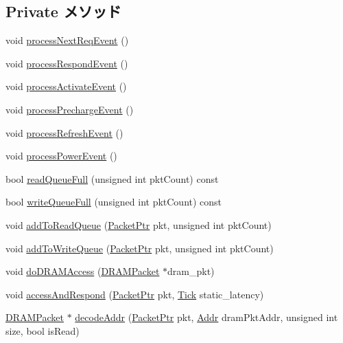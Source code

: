 \subsection*{Private メソッド}
\begin{DoxyCompactItemize}
\item 
void \hyperlink{classDRAMCtrl_a0798c7e6d736756005d72ec03a38badd}{processNextReqEvent} ()
\item 
void \hyperlink{classDRAMCtrl_ab4cdaf6d543d6785652264ff7ebbecac}{processRespondEvent} ()
\item 
void \hyperlink{classDRAMCtrl_ac54213c91d7d83dfe481534b1f165391}{processActivateEvent} ()
\item 
void \hyperlink{classDRAMCtrl_aac7163c120622a5f0bcc2291bc3054cd}{processPrechargeEvent} ()
\item 
void \hyperlink{classDRAMCtrl_a56cadd2563b7704b3af145a6a9f5e6ea}{processRefreshEvent} ()
\item 
void \hyperlink{classDRAMCtrl_a969289183ebadcc99a8dd9f63120b4eb}{processPowerEvent} ()
\item 
bool \hyperlink{classDRAMCtrl_a865d7144c26ea7f206d937e12935f840}{readQueueFull} (unsigned int pktCount) const 
\item 
bool \hyperlink{classDRAMCtrl_a34f56ea41ba7accf7b75a46aa79b560c}{writeQueueFull} (unsigned int pktCount) const 
\item 
void \hyperlink{classDRAMCtrl_ac224a72395d7f9bea08435f4aee435df}{addToReadQueue} (\hyperlink{classPacket}{PacketPtr} pkt, unsigned int pktCount)
\item 
void \hyperlink{classDRAMCtrl_a9538c5891b7139a62cffe6cbd7853b9a}{addToWriteQueue} (\hyperlink{classPacket}{PacketPtr} pkt, unsigned int pktCount)
\item 
void \hyperlink{classDRAMCtrl_a981a4462a622304ff598af5a232d7dd5}{doDRAMAccess} (\hyperlink{classDRAMCtrl_1_1DRAMPacket}{DRAMPacket} $\ast$dram\_\-pkt)
\item 
void \hyperlink{classDRAMCtrl_aa10846589da1206d0047f6b82c2814e4}{accessAndRespond} (\hyperlink{classPacket}{PacketPtr} pkt, \hyperlink{base_2types_8hh_a5c8ed81b7d238c9083e1037ba6d61643}{Tick} static\_\-latency)
\item 
\hyperlink{classDRAMCtrl_1_1DRAMPacket}{DRAMPacket} $\ast$ \hyperlink{classDRAMCtrl_a6d379162bc91622a9b1f1bdf82e062cc}{decodeAddr} (\hyperlink{classPacket}{PacketPtr} pkt, \hyperlink{base_2types_8hh_af1bb03d6a4ee096394a6749f0a169232}{Addr} dramPktAddr, unsigned int size, bool isRead)
\item 

\end{DoxyCompactItemize}
